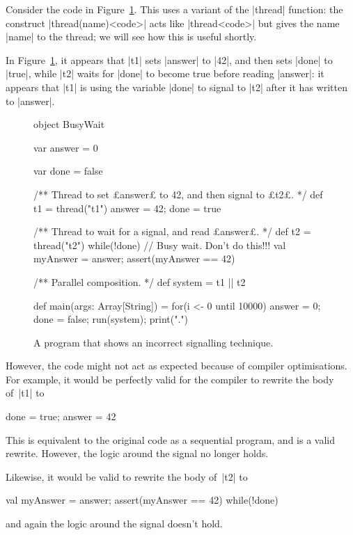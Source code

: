 Consider the code in Figure~\ref{fig:busyWait}.  This uses a variant of the
|thread| function: the construct |thread(name){<code>}| acts like
|thread{<code>}|  but gives the name |name| to the thread; we will see how
this is useful shortly.

In Figure~\ref{fig:busyWait}, it appears that |t1| sets |answer| to |42|, and
then sets |done| to |true|, while |t2| waits for |done| to become true before
reading |answer|: it appears that |t1| is using the variable |done| to signal
to |t2| after it has written to |answer|.

\begin{figure}
\begin{scala}
object BusyWait{
  var answer = 0

  var done = false

  /** Thread to set £answer£ to 42, and then signal to £t2£. */
  def t1 = thread("t1"){ answer = 42; done = true }

  /** Thread to wait for a signal, and read £answer£. */
  def t2 = thread("t2"){
    while(!done){ } // Busy wait.  Don't do this!!!
    val myAnswer = answer; assert(myAnswer == 42)
  }

  /** Parallel composition. */
  def system = t1 || t2

  def main(args: Array[String]) = { 
    for(i <- 0 until 10000){ answer = 0; done = false; run(system); print(".") }
  }
}
\end{scala}
\caption{A program that shows an incorrect signalling technique.}
\label{fig:busyWait}
\end{figure}

However, the code might not act as expected because of compiler
optimisations.  For example, it would be perfectly valid for the compiler to
rewrite the body of~|t1| to
\begin{scala}
  done = true; answer = 42
\end{scala}
%
This is equivalent to the original code as a sequential program, and is a
valid rewrite.  However, the logic around the signal no longer holds.

Likewise, it would be valid to rewrite the body of~|t2| to
\begin{scala}
  val myAnswer = answer; assert(myAnswer == 42)
  while(!done){ } 
\end{scala}
and again the logic around the signal doesn't hold.  

\pagebreak[3]


